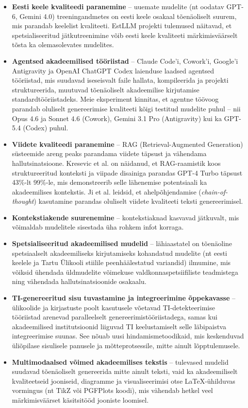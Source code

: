 \begin{itemize}
    \item \textbf{Eesti keele kvaliteedi paranemine} -- uuemate mudelite (nt oodatav GPT-6, Gemini 4.0) treeningandmetes on eesti keele osakaal tõenäoliselt suurem, mis parandab keelelist kvaliteeti. EstLLM projekti \cite{dorkin2026estllm} tulemused näitavad, et spetsialiseeritud jätkutreenimine võib eesti keele kvaliteeti märkimisväärselt tõsta ka olemasolevates mudelites.
    \item \textbf{Agentsed akadeemilised tööriistad} -- Claude Code'i, Cowork'i, Google'i Antigravity ja OpenAI ChatGPT Codex laienduse laadsed agentsed tööriistad, mis suudavad iseseisvalt faile hallata, kompileerida ja projekti struktureerida, muutuvad tõenäoliselt akadeemilise kirjutamise standardtööriistadeks. Meie eksperiment kinnitas, et agentne töövoog parandab oluliselt genereerimise kvaliteeti kõigi testitud mudelite puhul -- nii Opus 4.6 ja Sonnet 4.6 (Cowork), Gemini 3.1 Pro (Antigravity) kui ka GPT-5.4 (Codex) puhul.
    \item \textbf{Viidete kvaliteedi paranemine} -- RAG (Retrieval-Augmented Generation) süsteemide areng peaks parandama viidete täpsust ja vähendama hallutsinatsioone. Kresevic et al. \cite{kresevic2024rag} on näidanud, et RAG-raamistik koos struktureeritud konteksti ja viipade disainiga parandas GPT-4 Turbo täpsust 43\%-lt 99\%-le, mis demonstreerib selle lähenemise potentsiaali ka akadeemilises kontekstis. Ji et al. \cite{ji2024cot_citations} leidsid, et ahelpõhjendamise (\textit{chain-of-thought}) kasutamine parandas oluliselt viidete kvaliteeti teksti genereerimisel.
    \item \textbf{Kontekstiakende suurenemine} -- kontekstiaknad kasvavad jätkuvalt, mis võimaldab mudelitele sisestada üha rohkem infot korraga.
    \item \textbf{Spetsialiseeritud akadeemilised mudelid} -- lähiaastatel on tõenäoline spetsiaalselt akadeemiliseks kirjutamiseks kohandatud mudelite (nt eesti keelele ja Tartu Ülikooli stiilile peenhäälestatud variandid) ilmumine, mis võiksid ühendada üldmudelite võimekuse valdkonnaspetsiifiliste teadmistega ning vähendada hallutsinatsioonide osakaalu.
    \item \textbf{TI-genereeritud sisu tuvastamine ja integreerimine õppekavasse} -- ülikoolide ja kirjastuste poolt kasutusele võetavad TI-detekteerimise tööriistad arenevad paralleelselt genereerimistööriistadega, samas kui akadeemilised institutsioonid liiguvad TI keelustamiselt selle läbipaistva integreerimise suunas. See nõuab uusi hindamismetoodikaid, mis keskenduvad üliõpilase sisulisele panusele ja mõtteprotsessile, mitte ainult lõpptulemusele.
    \item \textbf{Multimodaalsed võimed akadeemilises tekstis} -- tulevased mudelid suudavad tõenäoliselt genereerida mitte ainult teksti, vaid ka akadeemiliselt kvaliteetseid jooniseid, diagramme ja visualiseerimisi otse \LaTeX{}-ühilduvas vormingus (nt TikZ või PGFPlots koodi), mis vähendab hetkel veel märkimisväärset käsitsitööd jooniste loomisel.
\end{itemize}


